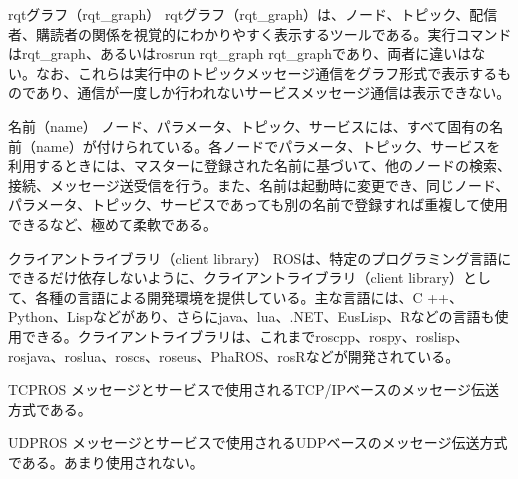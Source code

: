 
\begin{term}{rqtグラフ（rqt\_graph）}
rqtグラフ（rqt\_graph）は、ノード、トピック、配信者、購読者の関係を視覚的にわかりやすく表示するツールである。実行コマンドはrqt\_graph、あるいはrosrun rqt\_graph rqt\_graphであり、両者に違いはない。なお、これらは実行中のトピックメッセージ通信をグラフ形式で表示するものであり、通信が一度しか行われないサービスメッセージ通信は表示できない。
\end{term}


\begin{term}{名前（name）}
ノード、パラメータ、トピック、サービスには、すべて固有の名前（name）が付けられている。各ノードでパラメータ、トピック、サービスを利用するときには、マスターに登録された名前に基づいて、他のノードの検索、接続、メッセージ送受信を行う。また、名前は起動時に変更でき、同じノード、パラメータ、トピック、サービスであっても別の名前で登録すれば重複して使用できるなど、極めて柔軟である。
\end{term}


\begin{term}{クライアントライブラリ（client library）}
ROSは、特定のプログラミング言語にできるだけ依存しないように、クライアントライブラリ（client library）として、各種の言語による開発環境を提供している。主な言語には、C ++、Python、Lispなどがあり、さらにjava、lua、.NET、EusLisp、Rなどの言語も使用できる。クライアントライブラリは、これまでroscpp、rospy、roslisp、rosjava、roslua、roscs、roseus、PhaROS、rosRなどが開発されている。
\end{term}


\begin{term}{TCPROS}
メッセージとサービスで使用されるTCP/IPベースのメッセージ伝送方式である。
\end{term}


\begin{term}{UDPROS}
メッセージとサービスで使用されるUDPベースのメッセージ伝送方式である。あまり使用されない。
\end{term}

